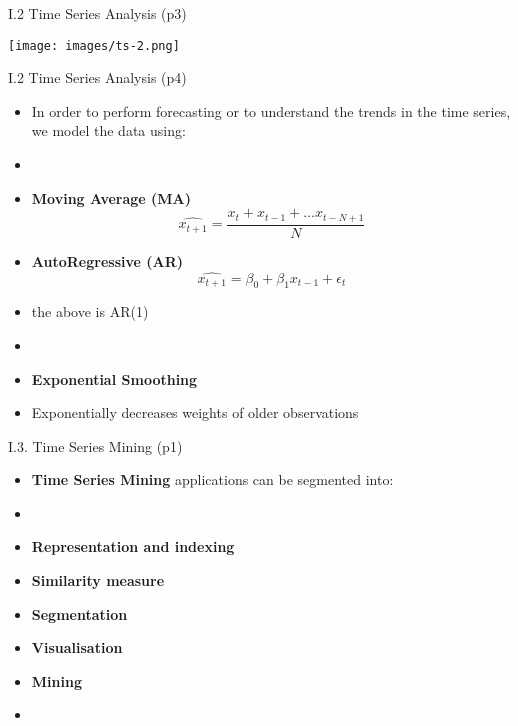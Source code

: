 \documentclass[handout]{beamer}
\newcommand{\strong}[1]{\textbf{\color{teal} #1}}
\newcommand{\stronger}[1]{\textbf{\color{purple} #1}}
\begin{document}
\begin{frame}{I.2 Time Series Analysis (p3)}
\begin{center}
\texttt{[image: images/ts-2.png]}
\end{center}
\end{frame}
\begin{frame}{I.2 Time Series Analysis (p4)}
\begin{itemize}
\item[] In order to perform forecasting or to understand the trends in the time series, we model the data using:
\item[]
\item \stronger{Moving Average (MA)}
\[
	\hat{x_{t+1}} = \frac{x_t + x_{t-1}+ \dots x_{t-N+1}}{N}
\]
\item \stronger{AutoRegressive (AR)}
\[
	\hat{x_{t+1}} = \beta_0 + \beta_1 x_{t-1}+\epsilon_t
\]
\item[] the above is AR(1)
\item[]
\item \stronger{Exponential Smoothing}
\item[] Exponentially decreases weights of older observations
\end{itemize}
\end{frame}
\begin{frame}{I.3. Time Series Mining (p1)}
\begin{itemize}
\item[] \stronger{Time Series Mining} applications can be segmented into:
\item[]
\item \strong{Representation and indexing}
\item \strong{Similarity measure}
\item \strong{Segmentation}
\item \strong{Visualisation}
\item \strong{Mining}
\item[] \cite{fu:2011}
\end{itemize}
\end{frame}
\end{document}
